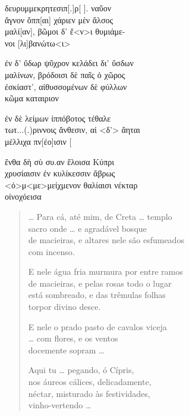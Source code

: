 \begin{gkverse}
\dagger{}δευρυμμεκρητεσιπ[.]ρ[ \quad].\dagger{} ναῦον\\
ἄγνον ὄππ[αι\quad] χάριεν μὲν ἄλσος\\
μαλί[αν], βῶμοι δ’ ἔ<ν>ι θυμιάμε-\\
νοι [λι]βανώτω<ι>

ἐν δ’ ὔδωρ ψῦχρον κελάδει δι’ ὔσδων\\
μαλίνων, βρόδοισι δὲ παῖς ὀ χῶρος\\
ἐσκίαστ’, αἰθυσσομένων δὲ φύλλων\\
κῶμα \dagger{}καταιριον

ἐν δὲ λείμων ἰππόβοτος τέθαλε\\
\dagger{}τωτ...(.)ριννοις\dagger{} ἄνθεσιν, αἰ <δ’> ἄηται\\
μέλλιχα πν[έο]ισιν [\\
\quad[\qquad\qquad]

ἔνθα δὴ σὺ \dagger{}συ.αν\dagger{} ἔλοισα Κύπρι\\
χρυσίαισιν ἐν κυλίκεσσιν ἄβρως\\
<ὀ>μ<με>μείχμενον θαλίαισι νέκταρ\\
οἰνοχόεισα
\end{gkverse}

\begin{verse}
\ldots{} Para cá, até mim, de Creta \ldots{} templo\\
sacro onde \ldots{} e agradável bosque\\
de macieiras, e altares nele são esfumeados\\
com incenso.\\

\medskip

E nele água fria murmura por entre ramos\\
de macieiras, e pelas rosas todo o lugar\\
está sombreado, e das trêmulas folhas\\
torpor divino desce.\\

\medskip

E nele o prado pasto de cavalos viceja\\
\ldots{} com flores, e os ventos\\
docemente sopram \ldots{}\\

\medskip

Aqui tu \ldots{} pegando, ó Cípris,\\ 
nos áureos cálices, delicadamente,\\
néctar, misturado às festividades,\\
vinho-vertendo \ldots{}\\
\end{verse}


